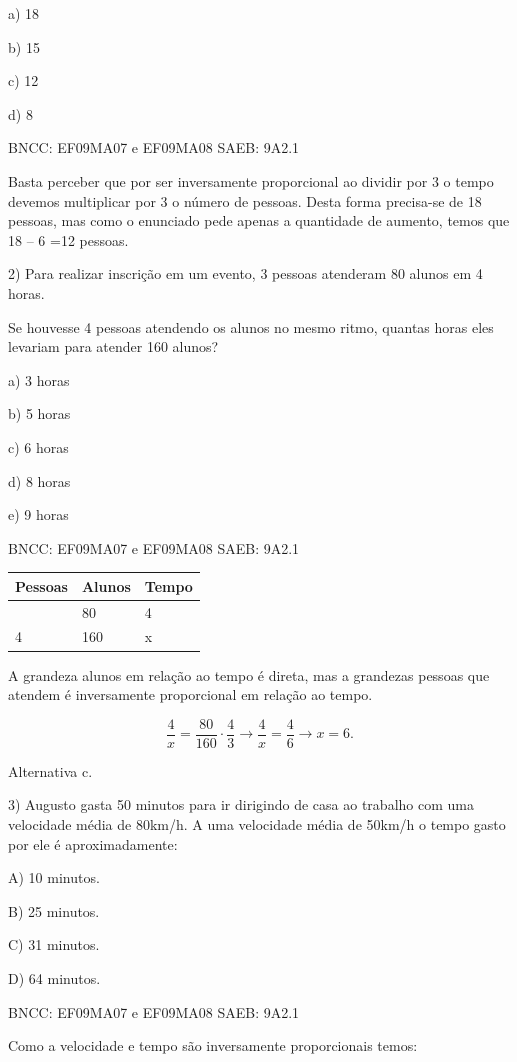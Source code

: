 \begin{escolha}
{{{\begin{escolha}
{a) 18

b) 15

c) 12

d) 8

BNCC: EF09MA07 e EF09MA08 SAEB: 9A2.1

Basta perceber que por ser inversamente proporcional ao dividir por 3 o
tempo devemos multiplicar por 3 o número de pessoas. Desta forma
precisa-se de 18 pessoas, mas como o enunciado pede apenas a quantidade
de aumento, temos que 18 -- 6 =12 pessoas.

2) Para realizar inscrição em um evento, 3 pessoas atenderam 80 alunos
em 4 horas.

Se houvesse 4 pessoas atendendo os alunos no mesmo ritmo, quantas horas
eles levariam para atender 160 alunos?

a) 3 horas

b) 5 horas

c) 6 horas

d) 8 horas

e) 9 horas

BNCC: EF09MA07 e EF09MA08 SAEB: 9A2.1

\begin{longtable}[]{@{}lll@{}}
\toprule\noalign{}
Pessoas & Alunos & Tempo \\
\midrule\noalign{}
\endhead
\bottomrule\noalign{}
\endlastfoot
3 & 80 & 4 \\
4 & 160 & x \\
\end{longtable}

A grandeza alunos em relação ao tempo é direta, mas a grandezas pessoas
que atendem é inversamente proporcional em relação ao tempo.

\[\frac{4}{x} = \frac{80}{160} \cdot \frac{4}{3} \rightarrow \frac{4}{x} = \frac{4}{6} \rightarrow x = 6.\]

Alternativa c.

3) Augusto gasta 50 minutos para ir dirigindo de casa ao trabalho com
uma velocidade média de 80km/h. A uma velocidade média de 50km/h o tempo
gasto por ele é aproximadamente:

A) 10 minutos.

B) 25 minutos.

C) 31 minutos.

D) 64 minutos.

BNCC: EF09MA07 e EF09MA08 SAEB: 9A2.1

Como a velocidade e tempo são inversamente proporcionais temos:

}
\end{escolha}}}}
\end{escolha}
